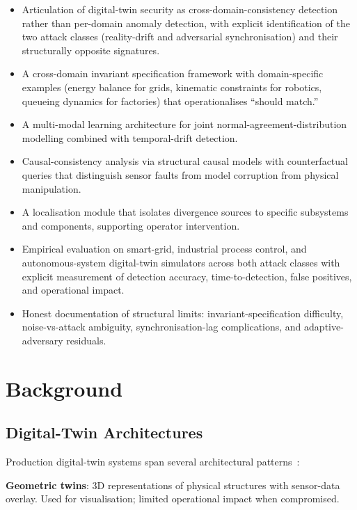 \documentclass[sigconf,nonacm]{acmart}
\begin{document}
\begin{itemize}
  \item Articulation of digital-twin security as
        cross-domain-consistency detection rather than per-domain
        anomaly detection, with explicit identification of the
        two attack classes (reality-drift and adversarial
        synchronisation) and their structurally opposite
        signatures.
  \item A cross-domain invariant specification framework with
        domain-specific examples (energy balance for grids,
        kinematic constraints for robotics, queueing dynamics for
        factories) that operationalises ``should match.''
  \item A multi-modal learning architecture for joint
        normal-agreement-distribution modelling combined with
        temporal-drift detection.
  \item Causal-consistency analysis via structural causal models
        with counterfactual queries that distinguish sensor faults
        from model corruption from physical manipulation.
  \item A localisation module that isolates divergence sources
        to specific subsystems and components, supporting
        operator intervention.
  \item Empirical evaluation on smart-grid, industrial process
        control, and autonomous-system digital-twin simulators
        across both attack classes with explicit measurement of
        detection accuracy, time-to-detection, false positives,
        and operational impact.
  \item Honest documentation of structural limits:
        invariant-specification difficulty, noise-vs-attack
        ambiguity, synchronisation-lag complications, and
        adaptive-adversary residuals.
\end{itemize}

\section{Background}

\subsection{Digital-Twin Architectures}

Production digital-twin systems span several architectural
patterns~\cite{tao2019digitaltwin,jones2020twinsurv}:

\textbf{Geometric twins}: 3D representations of physical
structures with sensor-data overlay. Used for visualisation;
limited operational impact when compromised.
\end{document}
